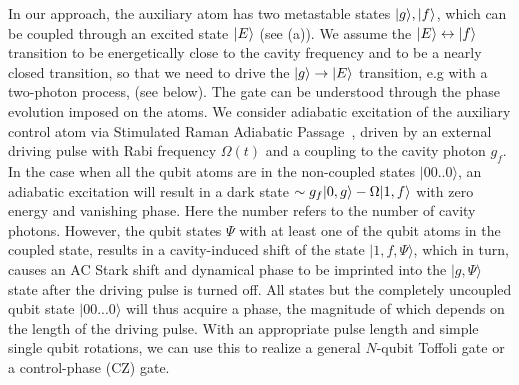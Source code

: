 In our approach, the auxiliary atom has two metastable states $| g \rangle,| f \rangle$,
which can be coupled through an excited state $| E \rangle$ (see
(a)). We assume the $| E \rangle\leftrightarrow| f \rangle$ transition
to be energetically close to the cavity frequency and to be a nearly closed
transition,  so that we need to drive the $| g \rangle\to | E \rangle$ transition, e.g
with a two-photon process, (see below).
The gate can be understood through the phase evolution imposed on the atoms. We
consider adiabatic excitation of the auxiliary control atom via Stimulated Raman
Adiabatic Passage~\cite{stirap,stirap2}, driven by an external driving pulse
with Rabi frequency $\Omega(t)$ and a coupling to the cavity photon $g_{f}$. In
the case when all the qubit atoms are in the non-coupled states $|00..0\rangle$,
an adiabatic excitation will result in a dark state $\sim g_{f} | 0,g \rangle
-\Omega | 1,f \rangle$ with zero energy and vanishing phase. Here the number refers
to the number of cavity photons.  However, the qubit states $\Psi$ with at least
one of the qubit atoms in the coupled state, results in a cavity-induced shift
of the state $|1,f, \Psi\rangle$, which in turn, causes an AC Stark shift and
dynamical phase to be imprinted into the $|g,\Psi\rangle$ state after the
driving pulse is turned off. All states but the completely uncoupled qubit state
$|00...0\rangle$ will thus acquire a phase, the magnitude of which depends on
the length of the driving pulse. With an appropriate pulse length and simple
single qubit rotations, we can use this to realize a general $N$-qubit Toffoli
gate or a control-phase (CZ) gate.

